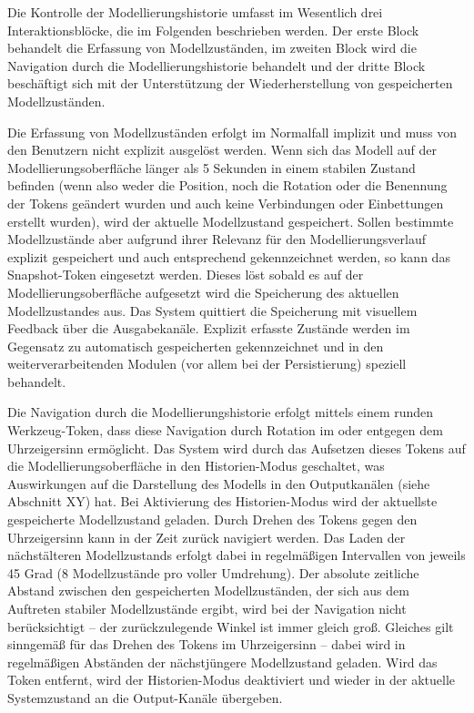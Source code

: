 Die Kontrolle der Modellierungshistorie umfasst im Wesentlich drei Interaktionsblöcke, die im Folgenden beschrieben werden. Der erste Block behandelt die Erfassung von Modellzuständen, im zweiten Block wird die Navigation durch die Modellierungshistorie behandelt und der dritte Block beschäftigt sich mit der Unterstützung der Wiederherstellung von gespeicherten Modellzuständen.

Die Erfassung von Modellzuständen erfolgt im Normalfall implizit und muss von den Benutzern nicht explizit ausgelöst werden. Wenn sich das Modell auf der Modellierungsoberfläche länger als 5 Sekunden in einem stabilen Zustand befinden (wenn also weder die Position, noch die Rotation oder die Benennung der Tokens geändert wurden und auch keine Verbindungen oder Einbettungen erstellt wurden), wird der aktuelle Modellzustand gespeichert. Sollen bestimmte Modellzustände aber aufgrund ihrer Relevanz für den Modellierungsverlauf explizit gespeichert und auch entsprechend gekennzeichnet werden, so kann das Snapshot-Token eingesetzt werden. Dieses löst sobald es auf der Modellierungsoberfläche aufgesetzt wird die Speicherung des aktuellen Modellzustandes aus. Das System quittiert die Speicherung mit visuellem Feedback über die Ausgabekanäle. Explizit erfasste Zustände werden im Gegensatz zu automatisch gespeicherten gekennzeichnet und in den weiterverarbeitenden Modulen (vor allem bei der Persistierung) speziell behandelt.

Die Navigation durch die Modellierungshistorie erfolgt mittels einem runden Werkzeug-Token, dass diese Navigation durch Rotation im oder entgegen dem Uhrzeigersinn ermöglicht. Das System wird durch das Aufsetzen dieses Tokens auf die Modellierungsoberfläche in den Historien-Modus geschaltet, was Auswirkungen auf die Darstellung des Modells in den Outputkanälen (siehe Abschnitt XY) hat. Bei Aktivierung des Historien-Modus wird der aktuellste gespeicherte Modellzustand geladen. Durch Drehen des Tokens gegen den Uhrzeigersinn kann in der Zeit zurück navigiert werden. Das Laden der nächstälteren Modellzustands erfolgt dabei in regelmäßigen Intervallen von jeweils 45 Grad (8 Modellzustände pro voller Umdrehung). Der absolute zeitliche Abstand zwischen den gespeicherten Modellzuständen, der sich aus dem Auftreten stabiler Modellzustände ergibt, wird bei der Navigation nicht berücksichtigt -- der zurückzulegende Winkel ist immer gleich groß. Gleiches gilt sinngemäß für das Drehen des Tokens im Uhrzeigersinn -- dabei wird in regelmäßigen Abständen der nächstjüngere Modellzustand geladen. Wird das Token entfernt, wird der Historien-Modus deaktiviert und wieder in der aktuelle Systemzustand an die Output-Kanäle übergeben.

